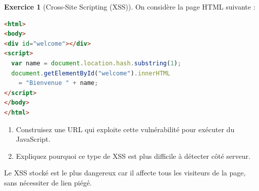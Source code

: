 \documentclass[a4paper,11pt]{article}
\theoremstyle{plain}
\theoremstyle{definition}
\newtheorem{exercice}{Exercice}
\begin{document}
\begin{exercice}[Cross-Site Scripting (XSS)]
On considère la page HTML suivante :

\begin{lstlisting}[language=HTML]
<html>
<body>
<div id="welcome"></div>
<script>
  var name = document.location.hash.substring(1);
  document.getElementById("welcome").innerHTML
    = "Bienvenue " + name;
</script>
</body>
</html>
\end{lstlisting}

\begin{enumerate}
    \item Construisez une URL qui exploite cette vulnérabilité pour exécuter du JavaScript.
    \item Expliquez pourquoi ce type de XSS est plus difficile à détecter côté serveur.
\end{enumerate}

\begin{attention}
Le XSS stocké est le plus dangereux car il affecte tous les visiteurs de la page, sans nécessiter de lien piégé.
\end{attention}

\end{exercice}


\end{document}
